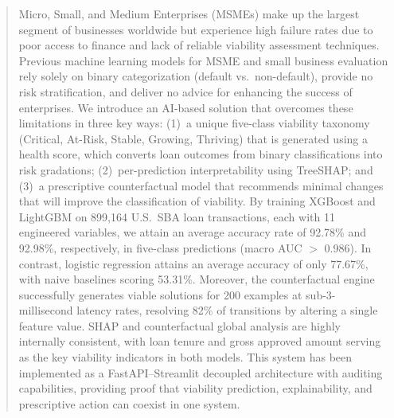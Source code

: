 \begin{abstract}
Micro, Small, and Medium Enterprises (MSMEs) make up the largest segment of businesses worldwide but experience high failure rates due to poor access to finance and lack of reliable viability assessment techniques. Previous machine learning models for MSME and small business evaluation rely solely on binary categorization (default vs.\ non-default), provide no risk stratification, and deliver no advice for enhancing the success of enterprises. We introduce an AI-based solution that overcomes these limitations in three key ways: (1)~a unique five-class viability taxonomy (Critical, At-Risk, Stable, Growing, Thriving) that is generated using a health score, which converts loan outcomes from binary classifications into risk gradations; (2)~per-prediction interpretability using TreeSHAP; and (3)~a prescriptive counterfactual model that recommends minimal changes that will improve the classification of viability. By training XGBoost and LightGBM on 899,164 U.S.\ SBA loan transactions, each with 11 engineered variables, we attain an average accuracy rate of 92.78\% and 92.98\%, respectively, in five-class predictions (macro AUC $>$ 0.986). In contrast, logistic regression attains an average accuracy of only 77.67\%, with naive baselines scoring 53.31\%. Moreover, the counterfactual engine successfully generates viable solutions for 200 examples at sub-3-millisecond latency rates, resolving 82\% of transitions by altering a single feature value. SHAP and counterfactual global analysis are highly internally consistent, with loan tenure and gross approved amount serving as the key viability indicators in both models. This system has been implemented as a FastAPI--Streamlit decoupled architecture with auditing capabilities, providing proof that viability prediction, explainability, and prescriptive action can coexist in one system.
\end{abstract}

